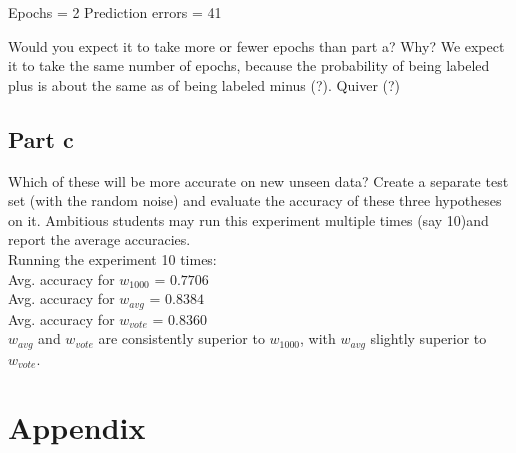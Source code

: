 \documentclass{article}
\begin{document}
Epochs = 2
Prediction errors = 41

Would you expect it to take more or fewer epochs than part a? Why?
We expect it to take the same number of epochs, because the probability of being labeled plus is about the same as of being labeled minus (?). Quiver (?)


\subsection*{Part c}

Which of these will be more accurate on new unseen data? Create a separate test set (with the random noise) and evaluate the accuracy of these three hypotheses on it. Ambitious students may run this experiment multiple times (say 10)and report the average accuracies.
\\
Running the experiment 10 times: \\
Avg. accuracy for $w_{1000}$ = $0.7706$ \\
Avg. accuracy for $w_{avg}$ = $0.8384$ \\
Avg. accuracy for $w_{vote}$ = $0.8360$ \\

\noindent $w_{avg}$ and $w_{vote}$ are consistently superior to $w_{1000}$, with $w_{avg}$ slightly superior to $w_{vote}$.

\clearpage
\section{Appendix}

\begin{tiny}



\end{tiny}
\end{document}
